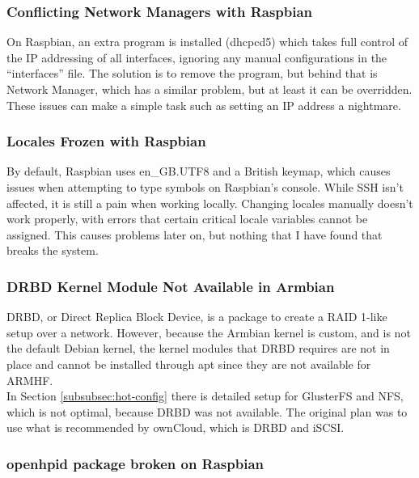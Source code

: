 \documentclass[12pt]{spieman}  %
\begin{document}
\subsubsection{Conflicting Network Managers with Raspbian}
\label{subsubsec:dhcpcd5}

On Raspbian, an extra program is installed (dhcpcd5) which takes full control of the IP addressing of all interfaces, ignoring any manual configurations in the “interfaces” file. The solution is to remove the program, but behind that is Network Manager, which has a similar problem, but at least it can be overridden. These issues can make a simple task such as setting an IP address a nightmare.

\subsubsection{Locales Frozen with Raspbian}
\label{subsubsec:locales}

By default, Raspbian uses en\_GB.UTF8 and a British keymap, which causes issues when attempting to type symbols on Raspbian's console. While SSH isn't affected, it is still a pain when working locally. Changing locales manually doesn't work properly, with errors that certain critical locale variables cannot be assigned. This causes problems later on, but nothing that I have found that breaks the system.

\subsubsection{DRBD Kernel Module Not Available in Armbian}
\label{subsubsec:drbd-error}

DRBD, or Direct Replica Block Device, is a package to create a RAID 1-like setup over a network. However, because the Armbian kernel is custom, and is not the default Debian kernel, the kernel modules that DRBD requires are not in place and cannot be installed through apt since they are not available for ARMHF.\\

In Section \ref{subsubsec:hot-config} there is detailed setup for GlusterFS and NFS, which is not optimal, because DRBD was not available. The original plan was to use what is recommended by ownCloud, which is DRBD and iSCSI.

\subsubsection{openhpid package broken on Raspbian}
\label{subsubsec:drupal-error}
\end{document}
